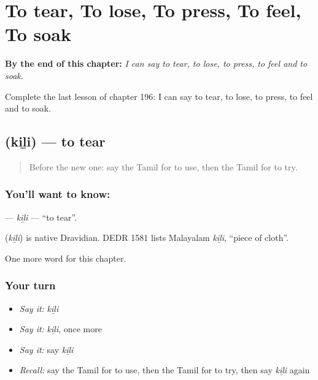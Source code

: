 
\chapter{To tear, To lose, To press, To feel, To soak}
\label{ch:ta-to-tear-to-lose-to-press-to-feel-to-soak}

\begin{chapteropening}
\textbf{By the end of this chapter:} \emph{I can say to tear, to lose, to press, to feel and to soak.}

Complete the last lesson of chapter 196: I can say to tear, to lose, to press, to feel and to soak.
\end{chapteropening}

\section[\texorpdfstring{\ta{கிழி} (kiḻi)}{கிழி (kiḻi)}]{ (kiḻi) — to tear}

\label{lesson:TA-C196-kili}



\begin{quote}
Before the new one: say the Tamil for to use, then the Tamil for to try.
\end{quote}

\subsection*{You'll want to know: }
\textbf{} — \emph{kiḻi} — \textquotedblleft{}to tear\textquotedblright{}.

\begin{cousinweb}
\textbf{} (\emph{kiḻi}) is native Dravidian. DEDR 1581 lists Malayalam \emph{kiḻi}, \textquotedblleft{}piece of cloth\textquotedblright{}.
\end{cousinweb}

\begin{grammarlens}[title={What you've built}]
One more word for this chapter.
\end{grammarlens}

\subsection*{Your turn}
\begin{itemize}
\raggedright
  \item \emph{Say it:} \emph{kiḻi}
  \item \emph{Say it:} \emph{kiḻi}, once more
  \item \emph{Say it:} say \emph{kiḻi}
  \item \emph{Recall:} say the Tamil for to use, then the Tamil for to try, then say \emph{kiḻi} again
\end{itemize}


